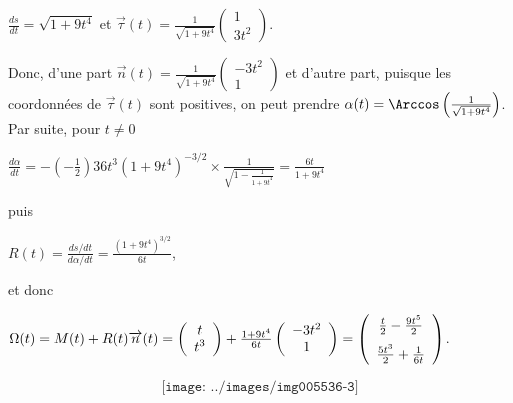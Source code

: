 {\begin{enumerate}
{\begin{center}
$\frac{ds}{dt}=\sqrt{1+9t^4}$ et $\overrightarrow{\tau}(t)=\frac{1}{\sqrt{1+9t^4}}\left(
\begin{array}{c}
1\\
3t^2
\end{array}
\right)$.
\end{center}
Donc, d'une part $\overrightarrow{n}(t)=\frac{1}{\sqrt{1+9t^4}}\left(
\begin{array}{c}
-3t^2\\
1
\end{array}
\right)$ et d'autre part, puisque les coordonnées de $\overrightarrow{\tau}(t)$ sont positives, on peut prendre $\alpha(t)=\Arccos\left(\frac{1}{\sqrt{1+9t^4}}\right)$. Par suite, pour $t\neq0$

\begin{center}
$\frac{d\alpha}{dt}=-\left(-\frac{1}{2}\right)36t^3(1+9t^4)^{-3/2}\times\frac{1}{\sqrt{1-\frac{1}{1+9t^4}}}=\frac{6t}{1+9t^4}$
\end{center}
puis

\begin{center}
$R(t)=\frac{ds/dt}{d\alpha/dt}=\frac{(1+9t^4)^{3/2}}{6t}$,
\end{center}
et donc

\begin{center}
$\Omega(t)=M(t)+R(t)\overrightarrow{n}(t)=\left(
\begin{array}{c}
t\\
t^3
\end{array}
\right)+
\frac{1+9t^4}{6t}\left(
\begin{array}{c}
-3t^2\\
1
\end{array}
\right)
=\left(
\begin{array}{c}
\frac{t}{2}-\frac{9t^5}{2}\\
\rule{0mm}{6mm}\frac{5t^3}{2}+\frac{1}{6t}
\end{array}
\right)$.
\end{center}

$$\texttt{[image: ../images/img005536-3]}$$
}
\end{enumerate}
}
